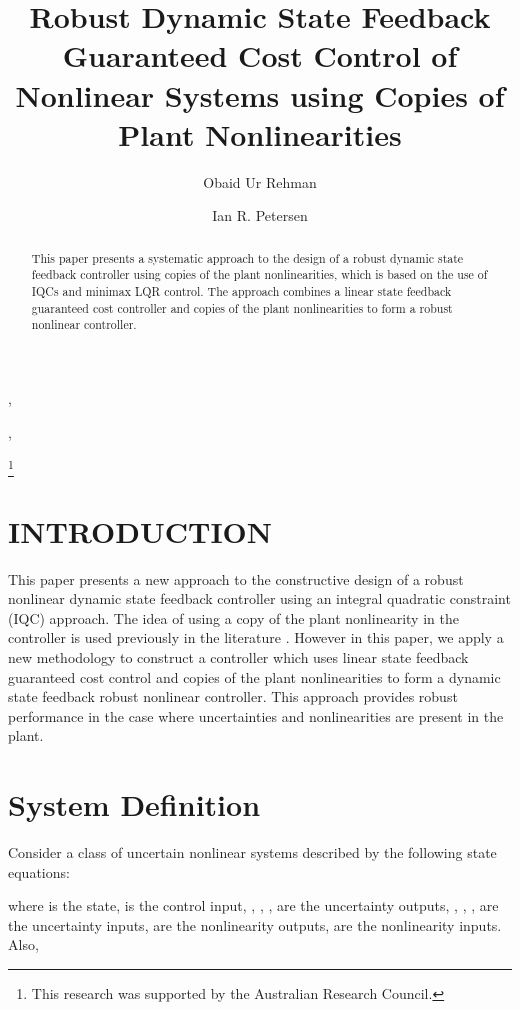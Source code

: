 \documentclass[twocolumn]{autart}
\begin{document}
\begin{frontmatter}
\title{Robust Dynamic State Feedback Guaranteed Cost Control of Nonlinear Systems using Copies of Plant Nonlinearities}

\author[SEIT]{Obaid Ur Rehman},    \author[SEIT]{Ian R. Petersen}, 
\address[SEIT]{School of Engineering and Information Technology, University of New South Wales, Canberra, Australia.} 
\thanks{This research was supported by the Australian Research Council.}
\begin{abstract}
This paper presents a systematic approach to the design of a robust dynamic state feedback controller using copies of the plant nonlinearities, which is based on the use of IQCs and minimax LQR control. The approach combines a linear state feedback guaranteed cost controller and copies of the plant nonlinearities to form a robust nonlinear controller.
\end{abstract}
\end{frontmatter}
\section{INTRODUCTION}
This paper presents a new approach to the constructive design of a robust nonlinear dynamic state feedback  controller using an integral quadratic constraint (IQC) approach. The idea of using a copy of the plant nonlinearity in the controller is used previously in the literature \cite{outputfeedback_petersen,GLover_Nonlinear,Chu_Nonlinear}. However in this paper, we apply a new methodology to  construct a controller which uses linear state feedback guaranteed cost control and copies of the plant nonlinearities to form a dynamic state feedback robust nonlinear controller. This approach provides robust performance in the case where uncertainties and nonlinearities are present in the plant. 
\section{System Definition}\label{sec:system}
Consider a class of uncertain nonlinear systems described by the following state equations:
\begin{small}

\end{small}

\noindent where  is the state,  is the control input, , , ,  are the uncertainty outputs, , , ,  are the uncertainty inputs,  are the nonlinearity outputs,  are the nonlinearity inputs.
Also,
\end{document}
